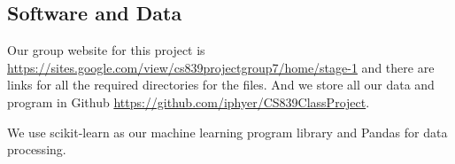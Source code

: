 \documentclass{article}
\begin{document}
\subsection*{Software and Data}
Our group website for this project is \url{https://sites.google.com/view/cs839projectgroup7/home/stage-1} and there are links for all the required directories for the files. And we store all our data and program in Github \url{https://github.com/iphyer/CS839ClassProject}.

We use scikit-learn \cite{scikit-learn} as our machine learning program library and Pandas \cite{mckinney2015pandas} for data processing.




\end{document}
